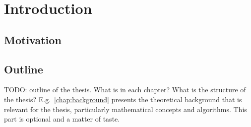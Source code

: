 \chapter{Introduction}\label{chap:introduction}

\section{Motivation}



\section{Outline}

TODO: outline of the thesis.
What is in each chapter? What is the structure of the thesis?
E.g.\ \cref{chap:background} presents the theoretical background that is relevant for the thesis, particularly mathematical concepts and algorithms.
This part is optional and a matter of taste.


